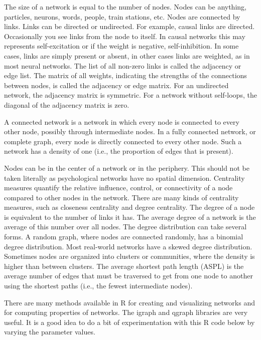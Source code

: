 \documentclass[
  a4paper,
  DIV=11,
  numbers=noendperiod,
  oneside]{scrreprt}
\begin{document}
The size of a network is equal to the number of nodes. Nodes can be
anything, particles, neurons, words, people, train stations, etc. Nodes
are connected by links. Links can be directed or undirected. For
example, causal links are directed. Occasionally you see links from the
node to itself. In causal networks this may represents self-excitation
or if the weight is negative, self-inhibition. In some cases, links are
simply present or absent, in other cases links are weighted, as in most
neural networks. The list of all non-zero links is called the adjacency
or edge list. The matrix of all weights, indicating the strengths of the
connections between nodes, is called the adjacency or edge matrix. For
an undirected network, the adjacency matrix is symmetric. For a network
without self-loops, the diagonal of the adjacency matrix is zero.

A connected network is a network in which every node is connected to
every other node, possibly through intermediate nodes. In a fully
connected network, or complete graph, every node is directly connected
to every other node. Such a network has a density of one (i.e., the
proportion of edges that is present).

Nodes can be in the center of a network or in the periphery. This should
not be taken literally as psychological networks have no spatial
dimension. Centrality measures quantify the relative influence, control,
or connectivity of a node compared to other nodes in the network. There
are many kinds of centrality measures, such as closeness centrality and
degree centrality. The degree of a node is equivalent to the number of
links it has. The average degree of a network is the average of this
number over all nodes. The degree distribution can take several forms. A
random graph, where nodes are connected randomly, has a binomial degree
distribution. Most real-world networks have a skewed degree
distribution. Sometimes nodes are organized into clusters or
communities, where the density is higher than between clusters. The
average shortest path length (ASPL) is the average number of edges that
must be traversed to get from one node to another using the shortest
paths (i.e., the fewest intermediate nodes).

There are many methods available in R for creating and visualizing
networks and for computing properties of networks. The igraph and qgraph
libraries are very useful. It is a good idea to do a bit of
experimentation with this R code below by varying the parameter values.
\end{document}
